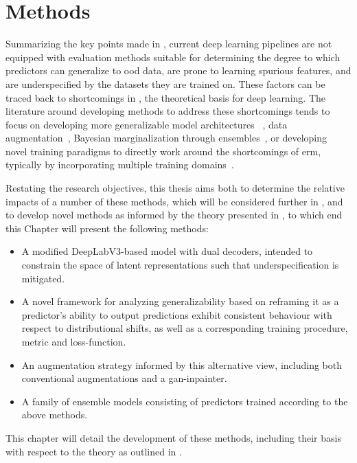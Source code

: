 \chapter{Methods}\label{methods}
Summarizing the key points made in , current deep learning pipelines are not equipped with evaluation methods suitable for determining the degree to which predictors can generalize to \gls{ood} data, are prone to learning spurious features, and are underspecified by the datasets they are trained on. These factors can be traced back to shortcomings in , the theoretical basis for deep learning. The literature around developing methods to address these shortcomings tends to focus on developing more generalizable model architectures ~\cite{attention_generalizability, endocv2021_gru, doubleencdec}, data augmentation~\cite{cyclegan, polyp_augmentation, deepaugment}, Bayesian marginalization through ensembles~\cite{endocv2021_ensemble_3,divergentnets, endoensemble}, or developing novel training paradigms to directly work around the shortcomings of \gls{erm}, typically by incorporating multiple training domains~\cite{IRM, modelbased}. 

Restating the research objectives, this thesis aims both to determine the relative impacts of a number of these methods, which will be considered further in , and to develop novel methods as informed by the theory presented in , to which end this Chapter will present the following methods:

\begin{itemize}
    \item A modified DeepLabV3-based model with dual decoders, intended to constrain the space of latent representations such that underspecification is mitigated.
    \item A novel framework for analyzing generalizability based on reframing it as a predictor's ability to output predictions exhibit consistent behaviour with respect to distributional shifts, as well as a corresponding training procedure, metric and loss-function.
    \item An augmentation strategy informed by this alternative view, including both conventional augmentations and a \gls{gan}-inpainter.
    \item A family of ensemble models consisting of predictors trained according to the above methods.
\end{itemize}

This chapter will detail the development of these methods, including their basis with respect to the theory as outlined in . 

